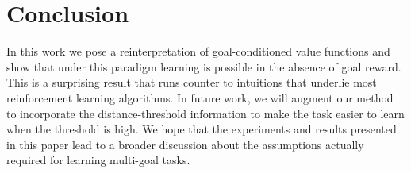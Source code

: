 \section{Conclusion}
In this work we pose a reinterpretation of goal-conditioned value
functions and show that under this paradigm learning is possible in the
absence of goal reward. This is a surprising result that runs counter
to intuitions that underlie most reinforcement learning algorithms.  
In future work, we will augment our method to incorporate the
distance-threshold information to make the task easier to learn when the
threshold is high. 
We hope that the experiments and results presented in this paper lead
to a broader discussion about the assumptions actually required for
learning multi-goal tasks.
